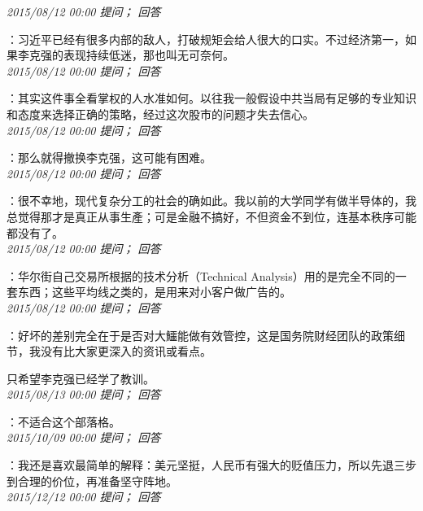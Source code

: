 \documentclass[twocolumn]{ctexart}
\begin{document}
\textit{\hfill\noindent\small 2015/08/12 00:00 提问； 回答}

：习近平已经有很多内部的敌人，打破规矩会给人很大的口实。不过经济第一，如果李克强的表现持续低迷，那也叫无可奈何。\\

\textit{\hfill\noindent\small 2015/08/12 00:00 提问； 回答}

：其实这件事全看掌权的人水准如何。以往我一般假设中共当局有足够的专业知识和态度来选择正确的策略，经过这次股市的问题才失去信心。\\

\textit{\hfill\noindent\small 2015/08/12 00:00 提问； 回答}

：那么就得撤换李克强，这可能有困难。\\

\textit{\hfill\noindent\small 2015/08/12 00:00 提问； 回答}

：很不幸地，现代复杂分工的社会的确如此。我以前的大学同学有做半导体的，我总觉得那才是真正从事生產；可是金融不搞好，不但资金不到位，连基本秩序可能都没有了。\\

\textit{\hfill\noindent\small 2015/08/12 00:00 提问； 回答}

：华尔街自己交易所根据的技术分析（Technical Analysis）用的是完全不同的一套东西；这些平均线之类的，是用来对小客户做广告的。\\

\textit{\hfill\noindent\small 2015/08/12 00:00 提问； 回答}

：好坏的差别完全在于是否对大鱷能做有效管控，这是国务院财经团队的政策细节，我没有比大家更深入的资讯或看点。

只希望李克强已经学了教训。\\

\textit{\hfill\noindent\small 2015/08/13 00:00 提问； 回答}

：不适合这个部落格。\\

\textit{\hfill\noindent\small 2015/10/09 00:00 提问； 回答}

：我还是喜欢最简单的解释：美元坚挺，人民币有强大的贬值压力，所以先退三步到合理的价位，再准备坚守阵地。\\

\textit{\hfill\noindent\small 2015/12/12 00:00 提问； 回答}
\end{document}
